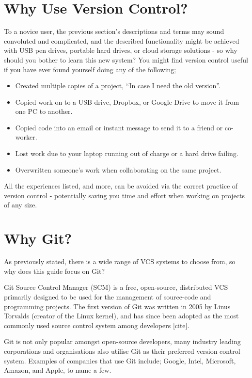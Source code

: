 \documentclass[10pt, a4paper, titlepage]{article}
\begin{document}
\section{Why Use Version Control?} 
To a novice user, the previous section's descriptions and terms may sound
convoluted and complicated, and the described functionality might be achieved
with USB pen drives, portable hard drives, or cloud storage solutions - so why
should you bother to learn this new system?  
You might find version control useful if you have ever found yourself doing
any of the following;
\begin{itemize}
\item Created multiple copies of a project, ``In case I need the old version''.
\item Copied work on to a USB drive, Dropbox, or Google Drive to move it from
one PC to another.
\item Copied code into an email or instant message to send it to a friend or
co-worker.
\item Lost work due to your laptop running out of charge or a hard drive
failing.
\item Overwritten someone's work when collaborating on the same project.
\end{itemize}

All the experiences listed, and more, can be avoided via the correct practice
of version control - potentially saving you time and effort when working on
projects of any size.



\section{Why Git?} 
As previously stated, there is a wide range of VCS systems to choose from, so
why does this guide focus on Git?


Git Source Control Manager (SCM) is a free, open-source, distributed VCS
primarily designed to be used for the management of source-code and
programming projects.  The first version of Git was written in 2005 by Linus
Torvalds (creator of the Linux kernel), and has since been adopted as the most
commonly used source control system among developers [cite].

Git is not only popular amongst open-source developers, many industry leading
corporations and organisations also utilise Git as their preferred version
control system.  Examples of companies that use Git include; Google, Intel,
Microsoft, Amazon, and Apple, to name a few.
\end{document}
